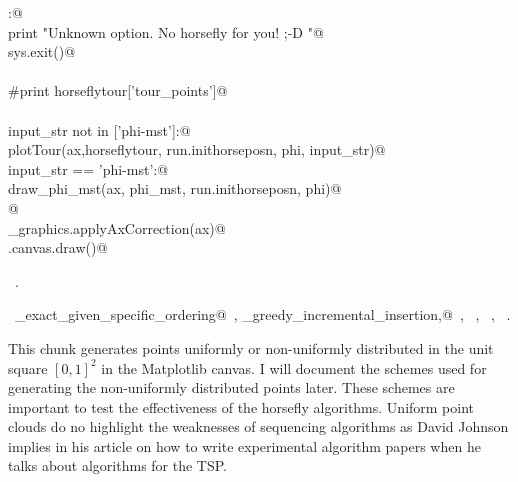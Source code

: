 \documentclass[11.5pt]{report}
\begin{document}
\begin{flushleft}
\begin{list}{}{}
\mbox{}\verb@else:@\\
\mbox{}\verb@      print "Unknown option. No horsefly for you! ;-D "@\\
\mbox{}\verb@      sys.exit()@\\
\mbox{}\verb@@\\
\mbox{}\verb@#print horseflytour['tour_points']@\\
\mbox{}\verb@@\\
\mbox{}\verb@if input_str not in ['phi-mst']:@\\
\mbox{}\verb@     plotTour(ax,horseflytour, run.inithorseposn, phi, input_str)@\\
\mbox{}\verb@elif input_str == 'phi-mst':@\\
\mbox{}\verb@     draw_phi_mst(ax, phi_mst, run.inithorseposn, phi)@\\
\mbox{}\verb@     @\\
\mbox{}\verb@utils_graphics.applyAxCorrection(ax)@\\
\mbox{}\verb@fig.canvas.draw()@\\
\mbox{}\verb@@{\NWsep}
\end{list}
\vspace{-1.5ex}
\footnotesize
\begin{list}{}{\setlength{\itemsep}{-\parsep}\setlength{\itemindent}{-\leftmargin}}
\item \NWtxtMacroRefIn\ .
\item \NWtxtIdentsUsed\nobreak\  \verb@algo_exact_given_specific_ordering@\nobreak\ , \verb@algo_greedy_incremental_insertion,@\nobreak\ , \verb@computeStructure@\nobreak\ , \verb@getTour@\nobreak\ , \verb@plotTour@\nobreak\ .
\item{}
\end{list}
\vspace{4ex}
\end{flushleft}

\vspace{-0.8cm}\newchunk This chunk generates points uniformly or non-uniformly distributed in the 
unit square $[0,1]^2$ in the Matplotlib canvas. I will document the schemes used for 
generating the non-uniformly distributed points later. These schemes are important to test the effectiveness of 
the horsefly algorithms. Uniform point clouds do no highlight the weaknesses of 
sequencing algorithms as David Johnson implies in his article on how to write 
experimental algorithm papers when he talks about algorithms for the TSP. 
\end{document}
